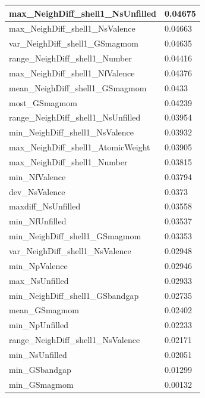 \begin{longtable}{|l|l|}
max\_NeighDiff\_shell1\_NsUnfilled & 0.04675 \\ \hline
max\_NeighDiff\_shell1\_NsValence & 0.04663 \\ \hline
var\_NeighDiff\_shell1\_GSmagmom & 0.04635 \\ \hline
range\_NeighDiff\_shell1\_Number & 0.04416 \\ \hline
max\_NeighDiff\_shell1\_NfValence & 0.04376 \\ \hline
mean\_NeighDiff\_shell1\_GSmagmom & 0.0433 \\ \hline
most\_GSmagmom & 0.04239 \\ \hline
range\_NeighDiff\_shell1\_NsUnfilled & 0.03954 \\ \hline
min\_NeighDiff\_shell1\_NsValence & 0.03932 \\ \hline
max\_NeighDiff\_shell1\_AtomicWeight & 0.03905 \\ \hline
max\_NeighDiff\_shell1\_Number & 0.03815 \\ \hline
min\_NfValence & 0.03794 \\ \hline
dev\_NsValence & 0.0373 \\ \hline
maxdiff\_NsUnfilled & 0.03558 \\ \hline
min\_NfUnfilled & 0.03537 \\ \hline
min\_NeighDiff\_shell1\_GSmagmom & 0.03353 \\ \hline
var\_NeighDiff\_shell1\_NsValence & 0.02948 \\ \hline
min\_NpValence & 0.02946 \\ \hline
max\_NsUnfilled & 0.02933 \\ \hline
min\_NeighDiff\_shell1\_GSbandgap & 0.02735 \\ \hline
mean\_GSmagmom & 0.02402 \\ \hline
min\_NpUnfilled & 0.02233 \\ \hline
range\_NeighDiff\_shell1\_NsValence & 0.02171 \\ \hline
min\_NsUnfilled & 0.02051 \\ \hline
min\_GSbandgap & 0.01299 \\ \hline
min\_GSmagmom & 0.00132 \\ \hline
\end{longtable}

\printbibliography[heading=subbibintoc]